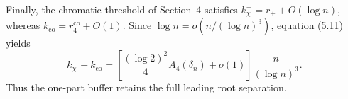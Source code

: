 Finally, the chromatic threshold of Section~4 satisfies
$k_\chi^-=r_++O(\log n)$, whereas
$k_{\mathrm{co}}=r_4^{\mathrm{co}}+O(1)$.  Since
$\log n=o(n/(\log n)^3)$, equation (5.11) yields
\begin{equation*}
  k_\chi^- - k_{\mathrm{co}}
  =
  \left[
    \frac{(\log 2)^2}{4}A_4(\delta_n)+o(1)
  \right]
  \frac{n}{(\log n)^3}.
  \tag{5.20}
\end{equation*}
Thus the one-part buffer retains the full leading root separation.
